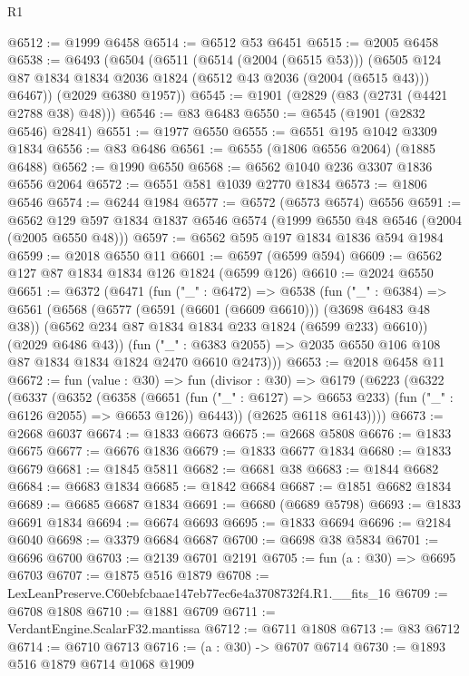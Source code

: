 \begin{lexlean}{R1}
\begin{coremodule}
@6512 := @1999 @6458
@6514 := @6512 @53 @6451
@6515 := @2005 @6458
@6538 := @6493
    (@6504
      (@6511
        (@6514 (@2004 (@6515 @53)))
        (@6505 @124 @87 @1834 @1834 @2036 @1824 (@6512 @43 @2036 (@2004 (@6515 @43))) @6467))
      (@2029 @6380 @1957))
@6545 := @1901 (@2829 (@83 (@2731 (@4421 @2788 @38) @48)))
@6546 := @83 @6483
@6550 := @6545 (@1901 (@2832 @6546) @2841)
@6551 := @1977 @6550
@6555 := @6551 @195 @1042 @3309 @1834
@6556 := @83 @6486
@6561 := @6555 (@1806 @6556 @2064) (@1885 @6488)
@6562 := @1990 @6550
@6568 := @6562 @1040 @236 @3307 @1836 @6556 @2064
@6572 := @6551 @581 @1039 @2770 @1834
@6573 := @1806 @6546
@6574 := @6244 @1984
@6577 := @6572 (@6573 @6574) @6556
@6591 := @6562 @129 @597 @1834 @1837 @6546 @6574 (@1999 @6550 @48 @6546 (@2004 (@2005 @6550 @48)))
@6597 := @6562 @595 @197 @1834 @1836 @594 @1984
@6599 := @2018 @6550 @11
@6601 := @6597 (@6599 @594)
@6609 := @6562 @127 @87 @1834 @1834 @126 @1824 (@6599 @126)
@6610 := @2024 @6550
@6651 := @6372
    (@6471
      (fun ("_" : @6472) =>
      @6538
        (fun ("_" : @6384) =>
        @6561
          (@6568
            (@6577 (@6591 (@6601 (@6609 @6610))) (@3698 @6483 @48 @38))
            (@6562 @234 @87 @1834 @1834 @233 @1824 (@6599 @233) @6610))
          (@2029 @6486 @43))
        (fun ("_" : @6383 @2055) => @2035 @6550 @106 @108 @87 @1834 @1834 @1824 @2470 @6610 @2473)))
@6653 := @2018 @6458 @11
@6672 := fun (value : @30) =>
  fun (divisor : @30) =>
  @6179
    (@6223
      (@6322
        (@6337
          (@6352
            (@6358
              (@6651 (fun ("_" : @6127) => @6653 @233) (fun ("_" : @6126 @2055) => @6653 @126))
              @6443))
          (@2625 @6118 @6143))))
@6673 := @2668 @6037
@6674 := @1833 @6673
@6675 := @2668 @5808
@6676 := @1833 @6675
@6677 := @6676 @1836
@6679 := @1833 @6677 @1834
@6680 := @1833 @6679
@6681 := @1845 @5811
@6682 := @6681 @38
@6683 := @1844 @6682
@6684 := @6683 @1834
@6685 := @1842 @6684
@6687 := @1851 @6682 @1834
@6689 := @6685 @6687 @1834
@6691 := @6680 (@6689 @5798)
@6693 := @1833 @6691 @1834
@6694 := @6674 @6693
@6695 := @1833 @6694
@6696 := @2184 @6040
@6698 := @3379 @6684 @6687
@6700 := @6698 @38 @5834
@6701 := @6696 @6700
@6703 := @2139 @6701 @2191
@6705 := fun (a : @30) => @6695 @6703
@6707 := @1875 @516 @1879
@6708 := LexLeanPreserve.C60ebfcbaae147eb77ec6e4a3708732f4.R1.__fits_16
@6709 := @6708 @1808
@6710 := @1881 @6709
@6711 := VerdantEngine.ScalarF32.mantissa
@6712 := @6711 @1808
@6713 := @83 @6712
@6714 := @6710 @6713
@6716 := (a : @30) -> @6707 @6714
@6730 := @1893
    @516
    @1879
    @6714
    @1068
    @1909

\end{coremodule}
\end{lexlean}
